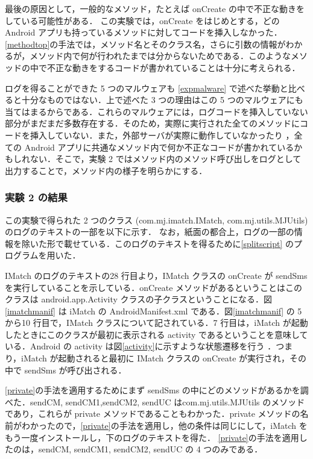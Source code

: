 最後の原因として，一般的なメソッド，たとえば onCreate の中で不正な動きをしている可能性がある． この実験では，onCreate をはじめとする，どの Android アプリも持っているメソッドに対してコードを挿入しなかった．\ref{methodtop}の手法では，メソッド名とそのクラス名，さらに引数の情報がわかるが，メソッド内で何が行われたまでは分からないためである．このようなメソッドの中で不正な動きをするコードが書かれていることは十分に考えられる．


ログを得ることができた 5 つのマルウェアも \ref{expmalware} で述べた挙動と比べると十分なものではない．上で述べた 3 つの理由はこの 5 つのマルウェアにも当てはまるからである．これらのマルウェアには，ログコードを挿入していない部分がまだまだ多数存在する．そのため，実際に実行された全てのメソッドにコードを挿入していない．また，外部サーバが実際に動作していなかったり ，全ての Android アプリに共通なメソッド内で何か不正なコードが書かれているかもしれない．そこで，実験 2 ではメソッド内のメソッド呼び出しをログとして出力することで，メソッド内の様子を明らかにする．


\subsubsection{実験 2 の結果}
この実験で得られた 2 つのクラス (com.mj.imatch.IMatch, com.mj.utils.MJUtils) のログのテキストの一部を以下に示す．
なお，紙面の都合上，ログの一部の情報を除いた形で載せている．このログのテキストを得るために\ref{splitscript} のプログラムを用いた．

IMatch のログのテキストの28 行目より，IMatch クラスの onCreate が sendSms を実行していることを示している．onCreate メソッドがあるということはこのクラスは android.app.Activity クラスの子クラスということになる．図\ref{imatchmanif} は iMatch の AndroidManifest.xml である．図\ref{imatchmanif} の 5 から10 行目で，IMatch クラスについて記されている．7 行目は，iMatch が起動したときにこのクラスが最初に表示される activity であるということを意味している．Android の activity は図\ref{activity}に示すような状態遷移を行う \cite{activity}．つまり，iMatch が起動されると最初に IMatch クラスの onCreate が実行され，その中で sendSms が呼び出される．

\ref{private}の手法を適用するためにまず sendSms の中にどのメソッドがあるかを調べた．sendCM, sendCM1,sendCM2, sendUC はcom.mj.utils.MJUtils のメソッドであり，これらが private メソッドであることもわかった．private メソッドの名前がわかったので，\ref{private}の手法を適用し，他の条件は同じにして，iMatch をもう一度インストールし，下のログのテキストを得た．
\ref{private}の手法を適用したのは，sendCM, sendCM1, sendCM2, sendUC の 4 つのみである．


